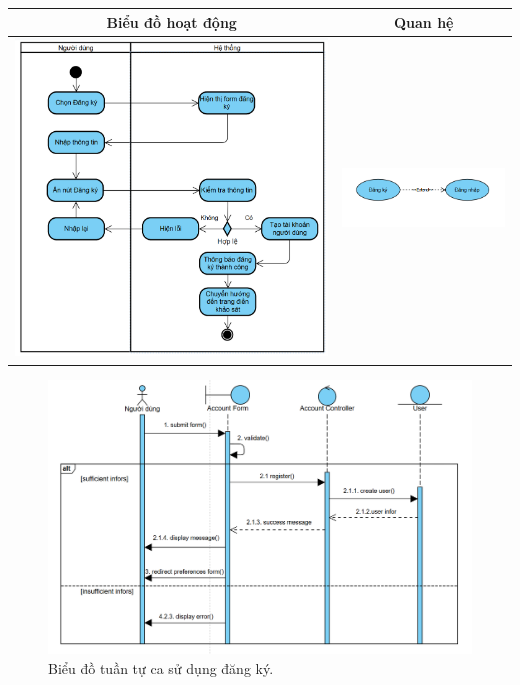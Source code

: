 \noindent 
\begin{tabular}{| c | c |}
    \hline
    \textbf{Biểu đồ hoạt động} & \textbf{Quan hệ} \\ 
    \hline
    \includegraphics[width=0.5\linewidth]{figures/c3/3-3-1-ad.png} 
    & 
    \includegraphics[width=0.45\linewidth]{figures/c3/3-3-1-rd.png} \\ 
    \hline
\end{tabular}




\begin{figure}[H]
    \centering  
    \includegraphics[width=1.05\textwidth]{figures/c3/3-3-1-sd.png}
    \caption{Biểu đồ tuần tự ca sử dụng đăng ký.}
    \label{fig:3-3-2-sequence-diagram}
\end{figure}